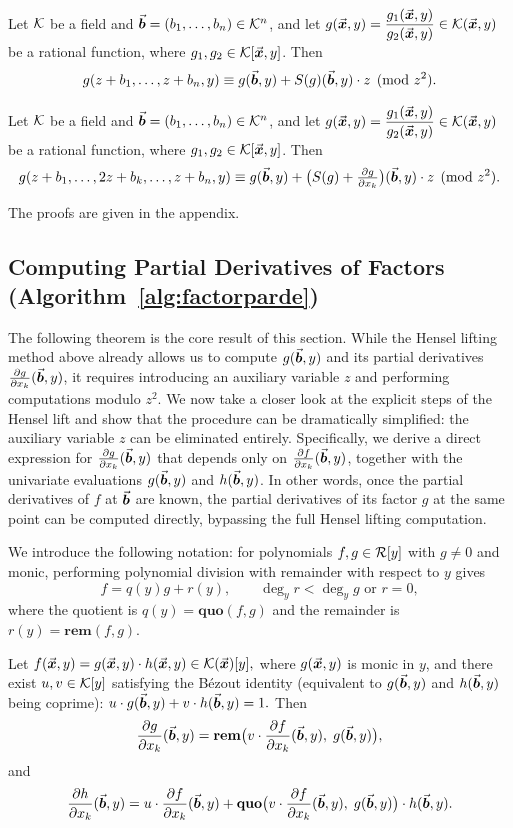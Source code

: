 \documentclass{article}
\numberwithin{equation}{section}
\begin{document}
\begin{lemma}\label{lm-2}
Let \({\mathcal{K}}\) be a field and $\vec{\boldsymbol{b}}=(b_1,\dots,b_n)\in{\mathcal{K}}^n$, and let \(g(\vec{\boldsymbol{x}},y) = \dfrac{g_1(\vec{\boldsymbol{x}},y)}{g_2(\vec{\boldsymbol{x}},y)}\in {\mathcal{K}}(\vec{\boldsymbol{x}},y)\) be a rational function, where \(g_1, g_2 \in {\mathcal{K}}[\vec{\boldsymbol{x}},y]\). Then
\[
g(z+b_1,\dots,z+b_n,y) \equiv g(\vec{\boldsymbol{b}},y) + S(g)(\vec{\boldsymbol{b}},y) \cdot z \pmod{z^2}.
\]
\end{lemma}


\begin{lemma}
Let \({\mathcal{K}}\) be a field and $\vec{\boldsymbol{b}}=(b_1,\dots,b_n)\in{\mathcal{K}}^n$, and let \(g(\vec{\boldsymbol{x}},y) = \dfrac{g_1(\vec{\boldsymbol{x}},y)}{g_2(\vec{\boldsymbol{x}},y)}\in {\mathcal{K}}(\vec{\boldsymbol{x}},y)\) be a rational function, where \(g_1, g_2 \in {\mathcal{K}}[\vec{\boldsymbol{x}},y]\). Then
\[
g(z+b_1,\dots,2z+b_k,\dots,z+b_n,y) \equiv g(\vec{\boldsymbol{b}},y) + \bigl(S(g)+\tfrac{\partial g}{\partial x_k}\bigr)(\vec{\boldsymbol{b}},y) \cdot z \pmod{z^2}.
\]
\end{lemma}
The proofs are given in the appendix.


\subsection{Computing Partial Derivatives of Factors (Algorithm~\ref{alg:factorparde})}
\label{sec:factor-derivative}

The following theorem is the core result of this section. While the Hensel lifting method above already allows us to compute $g(\vec{\boldsymbol{b}},y)$ and its partial derivatives $\frac{\partial g}{\partial x_k}(\vec{\boldsymbol{b}},y)$, it requires introducing an auxiliary variable $z$ and performing computations modulo $z^2$. We now take a closer look at the explicit steps of the Hensel lift and show that the procedure can be dramatically simplified: the auxiliary variable $z$ can be eliminated entirely. Specifically, we derive a direct expression for $\frac{\partial g}{\partial x_k}(\vec{\boldsymbol{b}},y)$ that depends only on $\frac{\partial f}{\partial x_k}(\vec{\boldsymbol{b}},y)$, together with the univariate evaluations $g(\vec{\boldsymbol{b}},y)$ and $h(\vec{\boldsymbol{b}},y)$. In other words, once the partial derivatives of $f$ at $\vec{\boldsymbol{b}}$ are known, the partial derivatives of its factor $g$ at the same point can be computed directly, bypassing the full Hensel lifting computation.


We introduce the following notation:  for polynomials $f, g \in {\mathcal{R}}[y]$ with $g \neq 0$ and monic, performing polynomial division with remainder with respect to $y$ gives
\[
f = q(y) g + r(y), \qquad \deg_y r < \deg_y g \text{ or } r = 0,
\]
where the quotient is $q(y) = \mathbf{quo}(f, g)$ and the remainder is $r(y) = \mathbf{rem}(f, g)$.


\begin{theorem}\label{the-1}
Let
%
$f(\vec{\boldsymbol{x}}, y) = g(\vec{\boldsymbol{x}}, y) \cdot h(\vec{\boldsymbol{x}}, y) \in {\mathcal{K}}(\vec{\boldsymbol{x}})[y],$
%
where \(g(\vec{\boldsymbol{x}}, y)\) is monic in \(y\), and there exist \(u, v \in {\mathcal{K}}[y]\) satisfying the B\'ezout identity (equivalent to \(g(\vec{\boldsymbol{b}}, y)\) and \(h(\vec{\boldsymbol{b}}, y)\) being coprime):
%
$u \cdot g(\vec{\boldsymbol{b}}, y) + v \cdot h(\vec{\boldsymbol{b}}, y) = 1.$
%
Then
\[
\frac{\partial g}{\partial x_k}(\vec{\boldsymbol{b}}, y) = 
\mathbf{rem}\bigl(v \cdot \frac{\partial f}{\partial x_k}(\vec{\boldsymbol{b}}, y),\; g(\vec{\boldsymbol{b}}, y)\bigr),
\]
and
\[
\frac{\partial h}{\partial x_k}(\vec{\boldsymbol{b}}, y) = u \cdot \frac{\partial f}{\partial x_k}(\vec{\boldsymbol{b}}, y) + 
\mathbf{quo}\bigl(v \cdot \frac{\partial f}{\partial x_k}(\vec{\boldsymbol{b}}, y),\; g(\vec{\boldsymbol{b}}, y)\bigr) \cdot h(\vec{\boldsymbol{b}}, y).
\]
\end{theorem}
\end{document}
